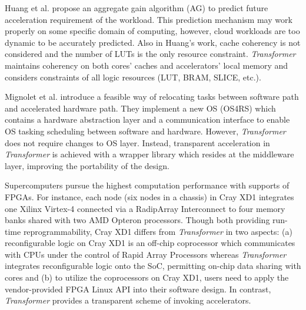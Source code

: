 Huang et al. propose an aggregate gain algorithm (AG)
\cite{Huang:2009hs} to predict future acceleration requirement of the
workload. This prediction mechanism may work properly on some specific
domain of computing, however, cloud workloads are too dynamic to be
accurately predicted. Also in Huang's work, cache coherency is not considered and the
number of LUTs is the only resource constraint. {\em Transformer}
maintains coherency on both cores' caches and accelerators' local
memory and considers constraints of all logic resources (LUT, BRAM,
SLICE, etc.).


Mignolet et al. \cite{Mignolet:2003gr} introduce a feasible way of
relocating tasks between software path and accelerated hardware
path. They implement a new OS (OS4RS) which contains a hardware
abstraction layer and a communication interface to enable OS tasking
scheduling between software and hardware. 
However, {\em Transformer} does not require changes to OS
layer. Instead, transparent acceleration in {\em Transformer} is
achieved with a wrapper library which resides at the middleware layer,
improving the portability of the design.


Supercomputers pursue the highest computation performance
\cite{Ulmer:2005vh} with supports of FPGAs. For instance, each node
(six nodes in a chassis) in Cray XD1 integrates one Xilinx Virtex-4
connected via a RadipArray Interconnect to four memory banks shared
with two AMD Opteron processors. Though both providing run-time
reprogrammability, Cray XD1 differs from {\em Transformer} in two
aspects: (a) reconfigurable logic on Cray XD1 is an off-chip
coprocessor which communicates with CPUs under the control of Rapid
Array Processors whereas {\em Transformer} integrates reconfigurable
logic onto the SoC, permitting on-chip data sharing with cores and (b)
to utilize the coprocessors on Cray XD1, users need to apply the
vendor-provided FPGA Linux API into their software design. In
contrast, {\em Transformer} provides a transparent scheme of invoking
accelerators.

